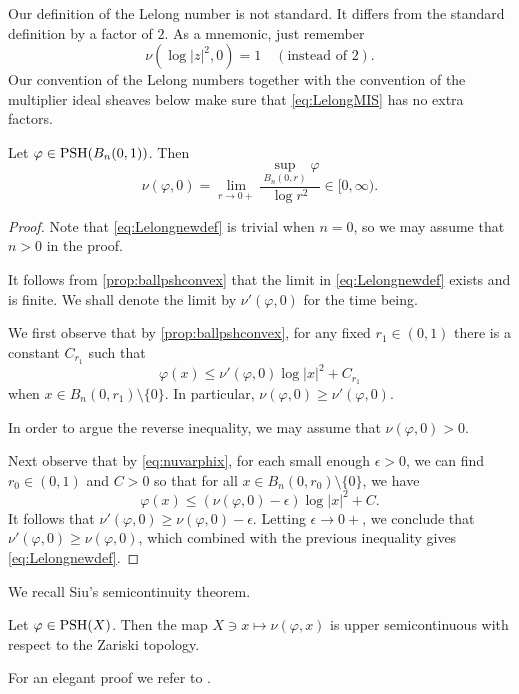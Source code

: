\begin{remark}\label{rmk:Lelongconv}
Our definition of the Lelong number is not standard. It differs from the standard definition by a factor of $2$. As a mnemonic, just remember
\[
\nu\left(\log |z|^2,0\right)=1 \quad (\text{instead of } 2).
\]
Our convention of the Lelong numbers together with the convention of the multiplier ideal sheaves below make sure that \eqref{eq:LelongMIS} has no extra factors.
\end{remark}



\begin{proposition}\label{prop:Lelongreform}
    Let $\varphi\in \mathrm{PSH}(B_n(0,1))$. Then
    \begin{equation}\label{eq:Lelongnewdef}
    \nu(\varphi,0)=\lim_{r \to 0+} \frac{\sup_{B_n(0,r)}\varphi}{\log r^2}\in [0,\infty).
    \end{equation}
\end{proposition}
\begin{proof}
    Note that \eqref{eq:Lelongnewdef} is trivial when $n=0$, so we may assume that $n>0$ in the proof.

    It follows from \cref{prop:ballpshconvex} that the limit in \eqref{eq:Lelongnewdef} exists and is finite. We shall denote the limit by $\nu'(\varphi,0)$ for the time being.

    We first observe that by \cref{prop:ballpshconvex}, for any fixed $r_1\in (0,1)$ there is a constant $C_{r_1}$ such that
    \begin{equation}\label{eq:varphixlocalupperbd}
    \varphi(x)\leq  \nu'(\varphi,0)\log |x|^2+C_{r_1}
    \end{equation}
    when $x\in B_n(0,r_1)\setminus \{0\}$. In particular, $\nu(\varphi,0)\geq \nu'(\varphi,0)$.

    In order to argue the reverse inequality, we may assume that $\nu(\varphi,0)>0$.

    Next observe that by \eqref{eq:nuvarphix}, for each small enough $\epsilon>0$, we can find $r_0\in (0,1)$ and $C>0$ so that for all $x\in B_n(0,r_0)\setminus \{0\}$, we have
    \[
    \varphi(x)\leq (\nu(\varphi,0)-\epsilon)\log |x|^2+C.
    \]
    It follows that $\nu'(\varphi,0)\geq \nu(\varphi,0)-\epsilon$. Letting $\epsilon\to 0+$, we conclude that $\nu'(\varphi,0)\geq \nu(\varphi,0)$, which combined with the previous inequality gives \eqref{eq:Lelongnewdef}.
\end{proof}

We recall Siu's semicontinuity theorem.
\begin{theorem}[Siu]\label{thm:Siusemi}
    Let $\varphi\in \mathrm{PSH}(X)$. Then the map $X\ni x\mapsto \nu(\varphi,x)$ is upper semicontinuous with respect to the Zariski topology.
\end{theorem}
For an elegant proof we refer to \cite[Theorem~2.10]{Dem12}.

